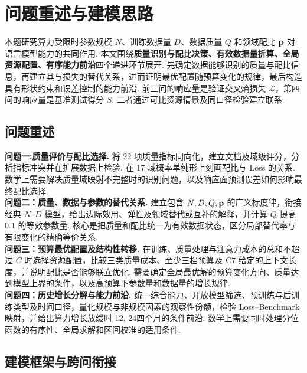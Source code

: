 \section{问题重述与建模思路}\label{sec:overview}

本题研究算力受限时参数规模 $N$、训练数据量 $D$、数据质量 $Q$ 和领域配比 $\mathbf p$ 对语言模型能力的共同作用. 本文围绕\textbf{质量识别与配比决策、有效数据量折算、全局资源配置、有序能力前沿}四个递进环节展开. 先确定数据能够识别的质量与配比信息，再建立其与损失的替代关系，进而证明最优配置随预算变化的规律，最后构造具有形状约束和误差控制的能力前沿. 前三问的响应量是验证交叉熵损失 $\mathcal L$，第四问的响应量是基准测试得分 $S$, 二者通过可比资源情景及同口径检验建立联系. 

\subsection{问题重述}
\noindent\textbf{问题一:质量评价与配比选择.}
将 22 项质量指标同向化，建立文档及域级评分，分析指标冲突并在扩展数据上检验. 在 17 域概率单纯形上刻画配比与 Loss 的关系. 数学上需要解决质量域映射不完整时的识别问题，以及响应面预测误差如何影响最终配比选择. \\
\noindent\textbf{问题二：质量、数据与参数的替代关系.}
建立包含 $N,D,Q,\mathbf p$ 的广义标度律，衔接经典 $N$--$D$ 模型，给出边际效用、弹性及领域替代或互补的解释，并计算 $Q$ 提高 $0.1$ 的等效参数量. 核心是把质量和配比统一为有效数据状态，区分局部替代率与有限变化的精确等价关系. \\
\noindent\textbf{问题三：预算最优配置及结构性转移.}
在训练、质量处理与注意力成本的总和不超过 $C$ 时选择资源配置，比较三类质量成本、至少三档预算及 C7 给定的上下文长度，并说明配比是否能够联立优化. 需要确定全局最优解的预算变化方向、质量达到模型上界的条件，以及高预算下参数量和数据量的增长规律. \\
\noindent\textbf{问题四：历史增长分解与能力前沿.}
统一综合能力、开放模型筛选、预训练与后训练类型及时间口径，量化规模与非规模因素的观察性份额，检验 Loss--Benchmark 映射，并给出算力增长放缓时 12, 24四个月的条件前沿. 数学上需要同时处理分位函数的有序性、全局求解和区间校准的适用条件. 

\subsection{建模框架与跨问衔接}

